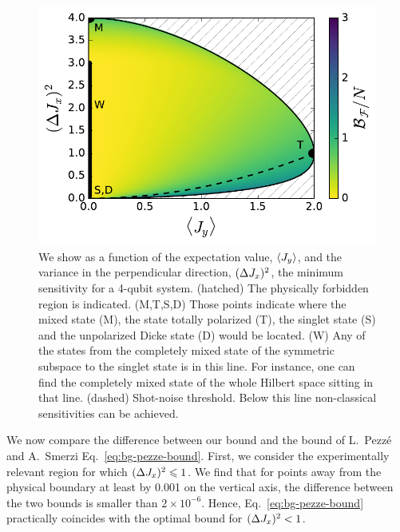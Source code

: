 \begin{figure}[htp]
  \centering
  \includegraphics[scale=.65]{img/LT_spsq2d_4.pdf}
  \caption[Precision bound for 4 particles for $\expect{J_y}$ and $\varian{J_x}$.]{
  We show as a function of the expectation value, $\expect{J_y}$, and the variance in the perpendicular direction, $\varian{J_x}$, the minimum sensitivity for a 4-qubit system.
  (hatched) The physically forbidden region is indicated. (M,T,S,D) Those points indicate where the mixed state (M), the state totally polarized (T), the singlet state (S) and the unpolarized Dicke state (D) would be located. (W) Any of the states from the completely mixed state of the symmetric subspace to the singlet state is in this line. For instance, one can  find the completely mixed state of the whole Hilbert space sitting in that line. (dashed) Shot-noise threshold. Below this line non-classical sensitivities can be achieved.}
  \label{fig:lt-spsq2d-4}
\end{figure}

We now compare the difference between our bound and the bound of L.~Pezz\'e and A.~Smerzi Eq.~\eqref{eq:bg-pezze-bound}.
First, we consider the experimentally relevant region for which $(\Delta J_x )^2\leqslant 1$.
We find that for points away from the physical boundary at least by 0.001 on the vertical axis, the difference between the two bounds is smaller than $2\times10^{-6}$.
Hence, Eq.~\eqref{eq:bg-pezze-bound} practically coincides with the optimal bound for $(\Delta J_x )^2<1$.

